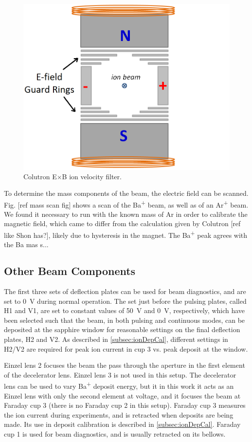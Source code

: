 \begin{figure}[H]
        \centering
                \includegraphics[width=.7\textwidth]{figures/ExB.png}
                \caption{Colutron E$\times$B ion velocity filter.}
\label{fig:exb}
\end{figure}

To determine the mass components of the beam, the electric field can be scanned.  Fig. [ref mass scan fig] shows a scan of the Ba\textsuperscript{+} beam, as well as of an Ar\textsuperscript{+} beam.  We found it necessary to run with the known mass of Ar in order to calibrate the magnetic field, which came to differ from the calculation given by Colutron [ref like Shon has?], likely due to hysteresis in the magnet.  The Ba\textsuperscript{+} peak agrees with the Ba mas s... 

\subsection{Other Beam Components}

The first three sets of deflection plates can be used for beam diagnostics, and are set to 0~V during normal operation.  The set just before the pulsing plates, called H1 and V1, are set to constant values of {\color{red}50~V and 0~V}, respectively, which have been selected such that the beam, in both pulsing and continuous modes, can be deposited at the sapphire window for reasonable settings on the final deflection plates, H2 and V2.  As described in \ref{subsec:ionDepCal}, different settings in H2/V2 are required for peak ion current in cup 3 vs. peak deposit at the window.

Einzel lens 2 focuses the beam the pass through the aperture in the first element of the decelerator lens.  Einzel lens 3 is not used in this setup.  The decelerator lens can be used to vary Ba\textsuperscript{+} deposit energy, but it in this work it acts as an Einzel lens with only the second element at voltage, and it focuses the beam at Faraday cup 3 (there is no Faraday cup 2 in this setup).  Faraday cup 3 measures the ion current during experiments, and is retracted when deposits are being made.  Its use in deposit calibration is described in \ref{subsec:ionDepCal}.  Faraday cup 1 is used for beam diagnostics, and is usually retracted on its bellows.  

